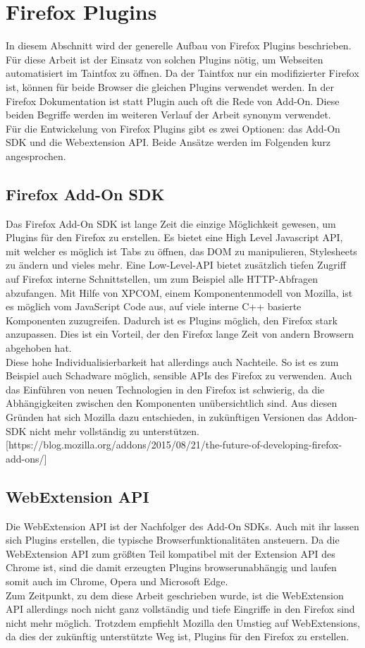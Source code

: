\section{Firefox Plugins}
\label{sec:FirefoxPlugins}
In diesem Abschnitt wird der generelle Aufbau von Firefox Plugins beschrieben. Für diese Arbeit ist der Einsatz von solchen Plugins nötig, um Webseiten automatisiert im Taintfox zu öffnen. Da der Taintfox nur ein modifizierter Firefox ist, können für beide Browser die gleichen Plugins verwendet werden. In der Firefox Dokumentation ist statt Plugin auch oft die Rede von Add-On. Diese beiden Begriffe werden im weiteren Verlauf der Arbeit synonym verwendet. \\
Für die Entwickelung von Firefox Plugins gibt es zwei Optionen: das Add-On SDK und die Webextension API. Beide Ansätze werden im Folgenden kurz angesprochen.
\subsection{Firefox Add-On SDK}
Das Firefox Add-On SDK ist lange Zeit die einzige Möglichkeit gewesen, um Plugins für den Firefox zu erstellen. Es bietet eine High Level Javascript API, mit welcher es möglich ist Tabs zu öffnen, das DOM zu manipulieren, Stylesheets zu ändern und vieles mehr. Eine Low-Level-API bietet zusätzlich tiefen Zugriff auf Firefox interne Schnittstellen, um zum Beispiel alle HTTP-Abfragen abzufangen. Mit Hilfe von XPCOM, einem Komponentenmodell von Mozilla, ist es möglich vom JavaScript Code aus, auf viele interne C++ basierte Komponenten zuzugreifen. Dadurch ist es Plugins möglich, den Firefox stark anzupassen. Dies ist ein Vorteil, der den Firefox lange Zeit von andern Browsern abgehoben hat. \\
Diese hohe Individualisierbarkeit hat allerdings auch Nachteile. So ist es zum Beispiel auch Schadware möglich, sensible APIs des Firefox zu verwenden. Auch das Einführen von neuen Technologien in den Firefox ist schwierig, da die Abhängigkeiten zwischen den Komponenten unübersichtlich sind. Aus diesen Gründen hat sich Mozilla dazu entschieden, in zukünftigen Versionen das Addon-SDK nicht mehr vollständig zu unterstützen. [https://blog.mozilla.org/addons/2015/08/21/the-future-of-developing-firefox-add-ons/]
\subsection{WebExtension API}
Die WebExtension API ist der Nachfolger des Add-On SDKs. Auch mit ihr lassen sich Plugins erstellen, die typische Browserfunktionalitäten ansteuern. Da die WebExtension API zum größten Teil kompatibel mit der Extension API des Chrome ist, sind die damit erzeugten Plugins browserunabhängig und laufen somit auch im Chrome, Opera und Microsoft Edge. \\
Zum Zeitpunkt, zu dem diese Arbeit geschrieben wurde, ist die WebExtension API allerdings noch nicht ganz vollständig und tiefe Eingriffe in den Firefox sind nicht mehr möglich. Trotzdem empfiehlt Mozilla den Umstieg auf WebExtensions, da dies der zukünftig unterstützte Weg ist, Plugins für den Firefox zu erstellen.
